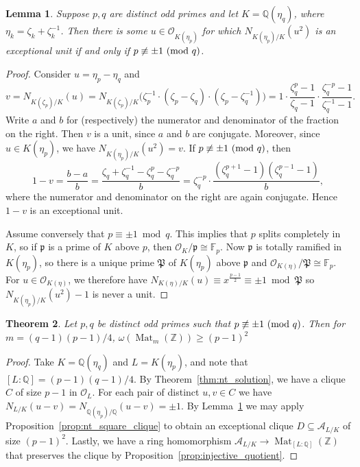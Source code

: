 \documentclass{amsart}
\theoremstyle{plain}
\newtheorem{theorem}{Theorem}[section]
\newtheorem{lemma}[theorem]{Lemma}
\theoremstyle{definition}
\DeclareMathOperator{\Mat}{Mat}
\newcommand{\ent}{\mathcal{O}}
\newcommand{\Z}{\ensuremath{\mathbb{Z}}}
\newcommand{\Q}{\ensuremath{\mathbb{Q}}}
\newcommand{\F}{\ensuremath{\mathbb{F}}}
\newcommand{\clq}{C}
\newcommand{\clqb}{D}
\begin{document}
\begin{lemma}\label{lem:exist_square_exceptional}
	Suppose \(p,q\) are distinct odd primes and let \(K=\Q(\eta_q)\), where \(\eta_k=\zeta_k+\zeta_k^{-1}\).
	Then there is some \(u\in\mathcal{O}_{K(\eta_p)}\) for which \(N_{K(\eta_p)/K}(u^2)\) is an exceptional unit if and only if \(p\not\equiv \pm 1\ (\textup{mod }q)\).
\end{lemma}
\begin{proof}
	Consider \(u=\eta_p-\eta_q\) and
	\[v=N_{K(\zeta_p)/K}(u)=N_{K(\zeta_p)/K}\big(\zeta_p^{-1}\cdot (\zeta_p-\zeta_q) \cdot (\zeta_p-\zeta_q^{-1})\big) = 1\cdot \frac{\zeta_q^p-1}{\zeta_q-1}\cdot\frac{\zeta_q^{-p}-1}{\zeta_q^{-1}-1}.\]
	Write $a$ and $b$ for (respectively) the numerator and denominator of the fraction on the right. Then \(v\) is a unit, since \(a\) and \(b\) are conjugate. 
	Moreover, since \(u\in K(\eta_p)\), we have \(N_{K(\eta_p)/K}(u^2)=v\). If \(p\not\equiv \pm 1\ (\textup{mod }q)\), then
	\[ 1-v = \frac{b-a}{b} = \frac{\zeta_q + \zeta_q^{-1} -\zeta_q^p-\zeta_q^{-p}}{b} = \zeta_q^{-p} \cdot \frac{(\zeta_q^{p+1}-1)(\zeta_q^{p-1}-1)}{b}, \]
	where the numerator and denominator on the right are again conjugate.
	Hence \(1-v\) is an exceptional unit.
	
	Assume conversely that $p\equiv\pm1\bmod q$. This implies that $p$ splits completely in $K$, so if $\mathfrak{p}$ is a prime of $K$ above $p$, then $\mathcal{O}_K/\mathfrak{p}\cong\F_p$. Now $\mathfrak{p}$ is totally ramified in $K(\eta_p)$, so there is a unique prime $\mathfrak{P}$ of $K(\eta_p)$ above $\mathfrak{p}$ and $\ent_{K(\eta)}/\mathfrak{P}\cong\F_p$. For $u\in\ent_{K(\eta)}$, we therefore have $N_{K(\eta)/K}(u)\equiv x^{\frac{p-1}{2}}\equiv \pm1 \bmod \mathfrak{P}$ so $N_{K(\eta_p)/K}(u^2)-1$ is never a unit.
\end{proof}

\begin{theorem}\label{th:main}
	Let \(p,q\) be distinct odd primes such that \(p\not\equiv \pm 1\ (\textup{mod }q)\).
	Then for $m=(q-1)(p-1)/4$, $\omega(\Mat_{m}(\Z))\geq (p-1)^2$
\end{theorem}
\begin{proof}
	Take \(K=\Q(\eta_q)\) and \(L=K(\eta_p)\), and note that \([L:\Q]=(p-1)(q-1)/4\). 
	By Theorem~\ref{thm:nt_solution}, we have a clique \(\clq\) of size \(p-1\) in \(\mathcal{O}_L\).
	For each pair of distinct \(u,v\in \clq\) we have \(N_{L/K}(u-v)=N_{\Q(\eta_p)/\Q}(u-v)=\pm 1\).
	By Lemma~\ref{lem:exist_square_exceptional} we may apply Proposition~\ref{prop:nt_square_clique} to obtain an exceptional clique \(\clqb\subseteq\mathcal{A}_{L/K}\) of size \((p-1)^2\).
	Lastly, we have a ring homomorphism \(\mathcal{A}_{L/K}\to \Mat_{[L:\Q]}(\Z)\) that preserves the clique by Proposition~\ref{prop:injective_quotient}.
\end{proof}
\end{document}

